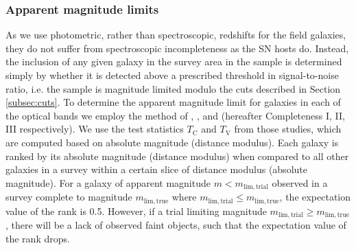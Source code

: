 \documentclass[fleqn,usenatbib]{mnras}
\begin{document}
\subsubsection{Apparent magnitude limits \label{subsubsec:mag_lims}}
As we use photometric, rather than spectroscopic, redshifts for the field galaxies, they do not suffer from spectroscopic incompleteness as the SN hosts do. Instead, the inclusion of any given galaxy in the survey area in the sample is determined simply by whether it is detected above a prescribed threshold in signal-to-noise ratio, i.e. the sample is magnitude limited modulo the cuts described in Section \ref{subsec:cuts}. To determine the apparent magnitude limit for galaxies in each of the optical bands we employ the method of \citet{Johnston2007}, \citet{Teodoro2010}, and \citet{Johnston2012} (hereafter Completeness I, II, III respectively). We use the test statistics $T_{\mathrm{C}}$ and $T_{\mathrm{V}}$ from those studies, which are computed based on absolute magnitude (distance modulus). Each galaxy is ranked by its absolute magnitude (distance modulus) when compared to all other galaxies in a survey within a certain slice of distance modulus (absolute magnitude). For a galaxy of apparent magnitude $m < m_{\mathrm{lim, trial}}$ observed in a survey complete to magnitude $m_{\mathrm{lim, true}}$ where  $m_{\mathrm{lim, trial}} \leq m_{\mathrm{lim, true}}$, the expectation value of the rank is 0.5. However, if a trial limiting magnitude $m_{\mathrm{lim, trial}} \geq m_{\mathrm{lim, true}}$, there will be a lack of observed faint objects, such that the expectation value of the rank drops.
\end{document}
